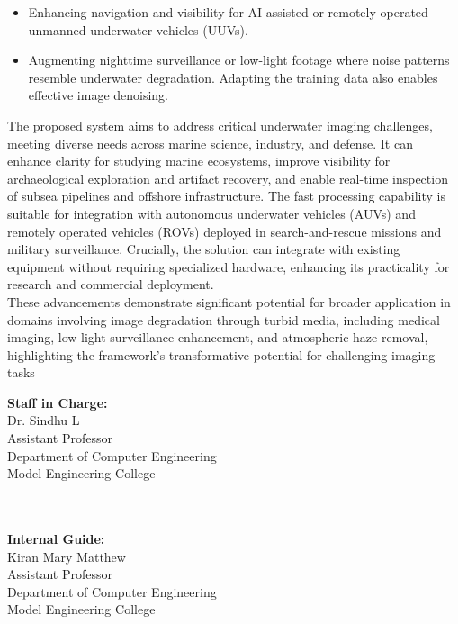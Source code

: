 \documentclass[12pt]{article}
\begin{document}
\begin{itemize}
    \item Enhancing navigation and visibility for AI-assisted or remotely operated unmanned underwater vehicles (UUVs).
    \item  Augmenting nighttime surveillance or low-light footage where noise patterns resemble underwater degradation. Adapting the training data also enables effective image denoising.

\end{itemize}

The proposed system aims to address critical underwater imaging challenges, meeting diverse needs across marine science, industry, and defense. It can enhance clarity for studying marine ecosystems, improve visibility for archaeological exploration and artifact recovery, and enable real-time inspection of subsea pipelines and offshore infrastructure. The fast processing capability is suitable for integration with autonomous underwater vehicles (AUVs) and remotely operated vehicles (ROVs) deployed in search-and-rescue missions and military surveillance. Crucially, the solution can integrate with existing equipment without requiring specialized hardware, enhancing its practicality for research and commercial deployment.\\

These advancements demonstrate significant potential for broader application in domains involving image degradation through turbid media, including medical imaging, low-light surveillance enhancement, and atmospheric haze removal, highlighting the framework's transformative potential for challenging imaging tasks\\

\nocite{*}



\vspace{0.5cm}

\noindent
\textbf{Staff in Charge:}\\
Dr. Sindhu L\\
Assistant Professor\\
Department of Computer Engineering\\
Model Engineering College

\vspace{0.5cm}

\noindent
\\
\\
\textbf{Internal Guide:}\\
Kiran Mary Matthew\\
Assistant Professor\\
Department of Computer Engineering\\
Model Engineering College
\end{document}
